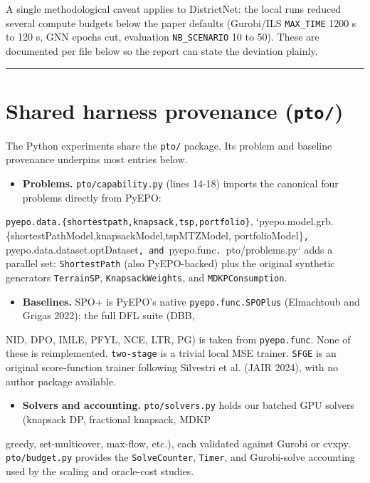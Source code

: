 \documentclass[10pt]{article}
\begin{document}
A single methodological caveat applies to DistrictNet: the local runs reduced several compute budgets below the
paper defaults (Gurobi/ILS \texttt{MAX\_TIME} 1200 s to 120 s, GNN epochs cut, evaluation \texttt{NB\_SCENARIO} 10 to 50). These are
documented per file below so the report can state the deviation plainly.

\medskip\hrule\medskip

\section*{Shared harness provenance (\texttt{pto/})}

The Python experiments share the \texttt{pto/} package. Its problem and baseline provenance underpins most entries below.

\begin{itemize}\setlength{\itemsep}{2pt}
\item \textbf{Problems.} \texttt{pto/capability.py} (lines 14-18) imports the canonical four problems directly from PyEPO:
\end{itemize}
  \texttt{pyepo.data.\{shortestpath,knapsack,tsp,portfolio\}}, `pyepo.model.grb.\{shortestPathModel,knapsackModel,tspMTZModel,
  portfolioModel\}\texttt{, }pyepo.data.dataset.optDataset\texttt{, and }pyepo.func\texttt{. }pto/problems.py` adds a parallel set:
  \texttt{ShortestPath} (also PyEPO-backed) plus the original synthetic generators \texttt{TerrainSP}, \texttt{KnapsackWeights}, and
  \texttt{MDKPConsumption}.
\begin{itemize}\setlength{\itemsep}{2pt}
\item \textbf{Baselines.} SPO+ is PyEPO's native \texttt{pyepo.func.SPOPlus} (Elmachtoub and Grigas 2022); the full DFL suite (DBB,
\end{itemize}
  NID, DPO, IMLE, PFYL, NCE, LTR, PG) is taken from \texttt{pyepo.func}. None of these is reimplemented. \texttt{two-stage} is a
  trivial local MSE trainer. \texttt{SFGE} is an original score-function trainer following Silvestri et al. (JAIR 2024), with
  no author package available.
\begin{itemize}\setlength{\itemsep}{2pt}
\item \textbf{Solvers and accounting.} \texttt{pto/solvers.py} holds our batched GPU solvers (knapsack DP, fractional knapsack, MDKP
\end{itemize}
  greedy, set-multicover, max-flow, etc.), each validated against Gurobi or cvxpy. \texttt{pto/budget.py} provides the
  \texttt{SolveCounter}, \texttt{Timer}, and Gurobi-solve accounting used by the scaling and oracle-cost studies.
\end{document}

